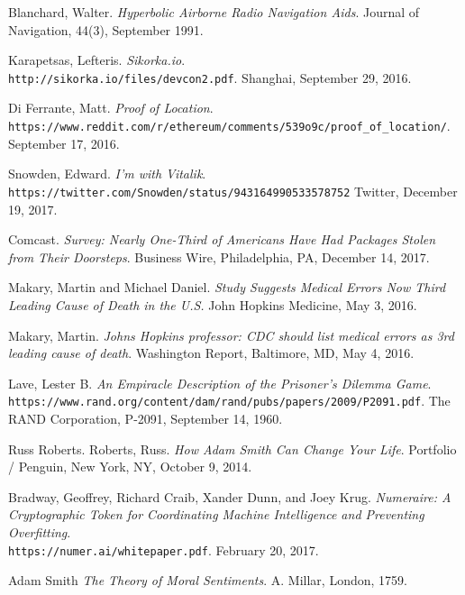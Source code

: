 \documentclass{article}
\begin{document}
\begin{thebibliography}{9}

Blanchard, Walter.
\textit{Hyperbolic Airborne Radio Navigation Aids}.
Journal of Navigation, 44(3), September 1991.

Karapetsas, Lefteris.
\textit{Sikorka.io}.
\\\texttt{http://sikorka.io/files/devcon2.pdf}.
Shanghai, September 29, 2016.

Di Ferrante, Matt.
\textit{Proof of Location}.
\\\texttt{https://www.reddit.com/r/ethereum/comments/539o9c/proof\_of\_location/}.
September 17, 2016.

Snowden, Edward.
\textit{I'm with Vitalik}.
\\\texttt{https://twitter.com/Snowden/status/943164990533578752}
Twitter, December 19, 2017.

Comcast.
\textit{Survey: Nearly One-Third of Americans Have Had Packages Stolen from Their Doorsteps}.
Business Wire, Philadelphia, PA, December 14, 2017.

Makary, Martin and Michael Daniel.
\textit{Study Suggests Medical Errors Now Third Leading Cause of Death in the U.S.}
John Hopkins Medicine, May 3, 2016.

Makary, Martin.
\textit{Johns Hopkins professor: CDC should list medical errors as 3rd leading cause of death}.
Washington Report, Baltimore, MD, May 4, 2016.

Lave, Lester B.
\textit{An Empiracle Description of the Prisoner's Dilemma Game}.
\\\texttt{https://www.rand.org/content/dam/rand/pubs/papers/2009/P2091.pdf}.
The RAND Corporation, P-2091, September 14, 1960.

Russ Roberts. 
Roberts, Russ. 
\textit{How Adam Smith Can Change Your Life}. 
Portfolio / Penguin, New York, NY, October 9, 2014.

Bradway, Geoffrey, Richard Craib, Xander Dunn, and Joey Krug.
\textit{Numeraire: A Cryptographic Token for Coordinating Machine Intelligence and Preventing Overfitting}.
\\\texttt{https://numer.ai/whitepaper.pdf}.
February 20, 2017.
 
Adam Smith
\textit{The Theory of Moral Sentiments}. 
A. Millar, London, 1759.

\end{thebibliography}

\printglossaries

\end{document}

